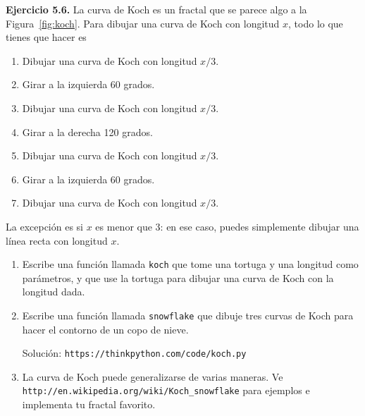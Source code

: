 \textbf{Ejercicio 5.6.} La curva de Koch es un fractal que se parece algo a la Figura~\ref{fig:koch}. Para dibujar una curva de Koch con longitud $x$, todo lo que tienes que hacer es

\begin{enumerate}
\item Dibujar una curva de Koch con longitud $x/3$.
\item Girar a la izquierda 60 grados.
\item Dibujar una curva de Koch con longitud $x/3$.
\item Girar a la derecha 120 grados.
\item Dibujar una curva de Koch con longitud $x/3$.
\item Girar a la izquierda 60 grados.
\item Dibujar una curva de Koch con longitud $x/3$.
\end{enumerate}

La excepción es si $x$ es menor que 3: en ese caso, puedes simplemente dibujar una línea recta con longitud $x$.

\begin{enumerate}
\item Escribe una función llamada \texttt{koch} que tome una tortuga y una longitud como parámetros, y que use la tortuga para dibujar una curva de Koch con la longitud dada.

\item Escribe una función llamada \texttt{snowflake} que dibuje tres curvas de Koch para hacer el contorno de un copo de nieve.

Solución: \texttt{https://thinkpython.com/code/koch.py}

\item La curva de Koch puede generalizarse de varias maneras. Ve \texttt{http://en.wikipedia.org/wiki/Koch\_snowflake} para ejemplos e implementa tu fractal favorito.
\end{enumerate}
